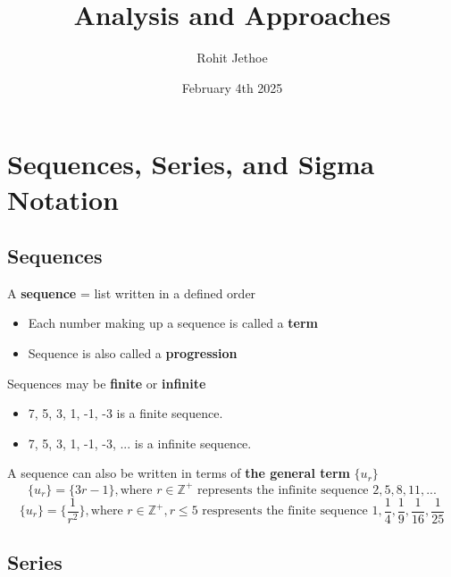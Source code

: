 \documentclass{article}
\title{Analysis and Approaches}
\author{Rohit Jethoe}
\date{February 4th 2025}
\begin{document}
\section{Sequences, Series, and Sigma Notation}
\subsection{Sequences}
A \textbf{sequence} = list written in a defined order
\begin{itemize}
        \item Each number making up a sequence is called a \textbf{term}
        \item Sequence is also called a \textbf{progression}
\end{itemize}
\hfill \break
Sequences may be \textbf{finite} or \textbf{infinite}
\begin{itemize}
        \item 7, 5, 3, 1, -1, -3 is a finite sequence.
        \item 7, 5, 3, 1, -1, -3, ... is a infinite sequence.
\end{itemize}
\hfill \break
A sequence can also be written in terms of \textbf{the general term} $ \{u_r\} $
$$ \{u_r\} = \{3r - 1\}, \text{where }r \in \mathbb{Z}^{+} \text{ represents the infinite sequence } 2,5,8,11, ...$$
$$ \{u_r\} = \{\dfrac{1}{r^2}\}, \text{where } r \in \mathbb{Z}^+, r \leq 5 \text{ respresents the finite sequence } 1,\dfrac{1}{4}, \dfrac{1}{9}, \dfrac{1}{16}, \dfrac{1}{25}$$
\hfill \break
\subsection{Series}
\end{document}
